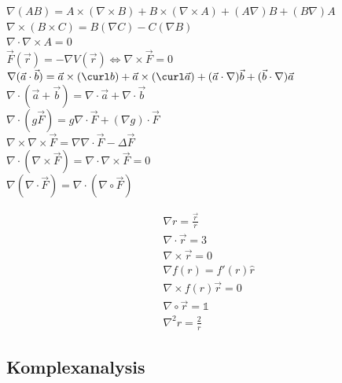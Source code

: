 \documentclass[12pt,a4paper]{article}
\newcommand{\grad}[1]{\nabla #1}
\renewcommand{\div}[1]{\nabla \cdot #1}
\newcommand{\rot}[1]{\nabla \times #1}
\renewcommand{\=}[1]{\stackrel{#1}{=}}
\newcommand{\ort}{\vec r}
\theoremstyle{definition}
\theoremstyle{remark}
\begin{document}
\begin{center}
\begin{minipage}[t]{.59\linewidth}
\vspace{0pt}

$\grad (AB) = A \times (\rot B) + B \times (\rot A) + (A\nabla)B + (B\nabla)A$\\
$\rot (B \times C) = B(\grad C) - C(\grad B)$\\
$\div \rot A = 0$\\
$\vec F (\vec r) = - \grad V(\vec r) \Leftrightarrow \nabla \times \vec{F} = 0$\\
$\grad (\vec a \cdot \vec b) = \vec a \times (\curl b) + \vec a \times (\curl \vec a) + (\vec a \cdot \grad) \vec b + (\vec b \cdot \grad) \vec a$\\
$\div (\vec a + \vec b) = \div \vec a + \div \vec b$\\
$\div (g\vec F) = g \div \vec F + (\grad g) \cdot \vec F$\\
$\rot \rot \vec{F} = \grad \div \vec{F} - \Delta \vec{F}$\\
$\div (\rot \vec{F}) = \div \rot \vec{F} = 0$\\
$\grad(\div \vec F) = \div (\grad \circ \vec F)$\\

\end{minipage}%
\begin{minipage}[t]{.39\linewidth}
\vspace{0pt}
\begin{framed}
\begin{align*}
&\grad r = \frac{\ort}{r}\\
&\div \ort = 3\\
&\rot \ort = 0\\
&\grad f(r) = f'(r) \hat r\\
&\rot f(r) \ort = 0\\
&\nabla \circ \ort = \mathbb{1}\\
&\nabla^2 r = \frac{2}{r}
\end{align*}
\end{framed}

\end{minipage}
\end{center}

\subsection{Komplexanalysis}
\end{document}
